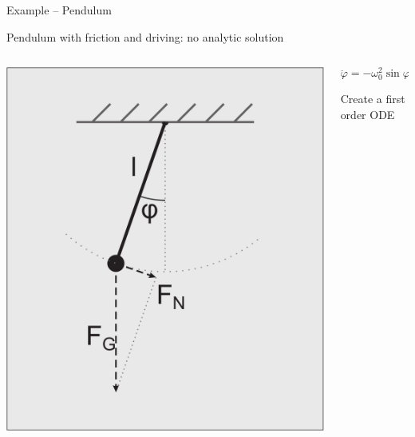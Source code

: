 \documentclass{beamer}
\newcommand{\heading}[1]{\centerline{\Large #1} \vspace{0.5em}}
\begin{document}
\begin{frame}[fragile]

\heading{Example -- Pendulum}

\vspace{2ex}

Pendulum with friction and driving: no analytic solution

\vspace{2ex}

\begin{columns}[T]
  \begin{column}{0.35\textwidth}
    \includegraphics[draft=false,width=1.0\textwidth]{pendulum.pdf}

   \vspace{4ex}
  \end{column}

  \begin{column}{0.65\textwidth}
 $$\ddot{\varphi} = -\omega_0^2 \sin \varphi - \mu \dot{\varphi} + \varepsilon \sin \omega_E t $$

 \vspace{2ex}

 Create a first order ODE


\end{column}
\end{columns}
\end{frame}
\end{document}
